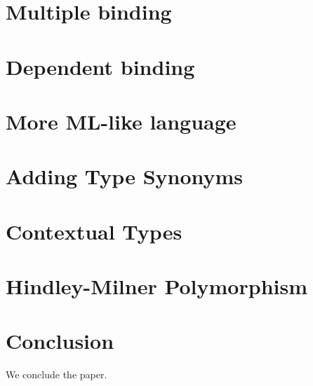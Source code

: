 \documentclass[format=acmlarge,review,anonymous]{acmart}\settopmatter{printfolios=true}
\begin{document}
\maketitle

{
  \setlength{\leftskip}{1em}
  \setlength{\parindent}{-1em}
  \setlength{\parskip}{3pt}

  
  
  
  
  
  \section{Multiple binding}
  
  
  \section{Dependent binding}
  
  
  \section{More ML-like language}
  
  
  \section{Adding Type Synonyms}
  
  
  \section{Contextual Types}
  
  
  \section{Hindley-Milner Polymorphism}
  
}

\section{Conclusion}

\TODO{} We conclude the paper.


\end{document}
